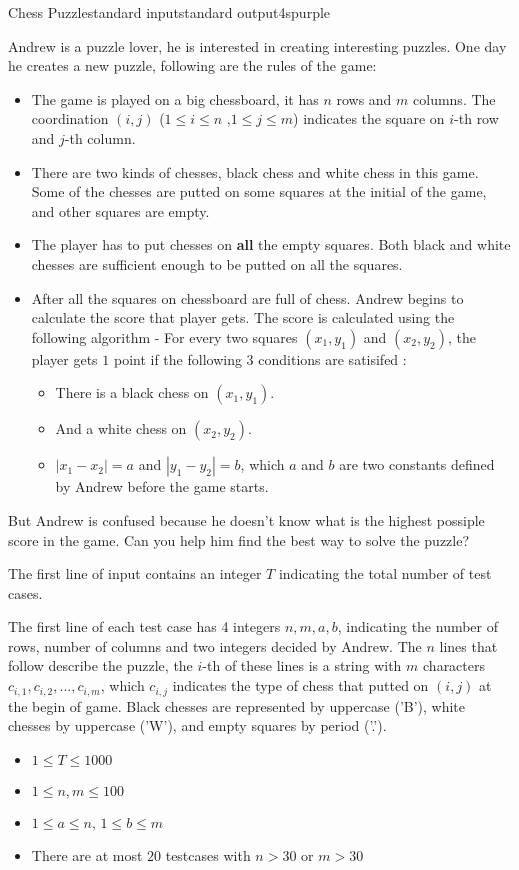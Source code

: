 \begin{problem}{Chess Puzzle}{standard input}{standard output}{4s}{purple}

Andrew is a puzzle lover, he is interested in creating interesting puzzles. One day he creates a new puzzle, following are the rules of the game:
\begin{itemize}
\item The game is played on a big chessboard, it has $n$ rows and $m$ columns. The coordination $(i,j)$ ($1 \le i \le n$ ,$1 \le j \le m$) indicates the square on $i$-th row and $j$-th column.
\item There are two kinds of chesses, black chess and white chess in this game. Some of the chesses are putted on some squares at the initial of the game, and other squares are empty.
\item The player has to put chesses on {\bf all} the empty squares. Both black and white chesses are sufficient enough to be putted on all the squares.
\item After all the squares on chessboard are full of chess. Andrew begins to calculate the score that player gets. The score is calculated using the following algorithm - For every two squares $(x_1, y_1)$ and $(x_2,y_2)$, the player gets $1$ point if the following $3$ conditions are satisifed :
\begin{itemize}
\item There is a black chess on $(x_1, y_1)$.
\item And a white chess on $(x_2, y_2)$.
\item $|x_1 - x_2|=a$ and $|y_1 - y_2| = b$, which $a$ and $b$ are two constants defined by Andrew before the game starts.
\end{itemize}
\end{itemize}
 
But Andrew is confused because he doesn't know what is the highest possiple score in the game. Can you help him find the best way to solve the puzzle?

\InputFile
The first line of input contains an integer $T$ indicating the total number of test cases.

The first line of each test case has 4 integers $n, m, a, b$, indicating the number of rows, number of columns and two integers decided by Andrew.
The $n$ lines that follow describe the puzzle, the $i$-th of these lines is a string with $m$ characters $c_{i,1}, c_{i,2},..., c_{i,m}$, which $c_{i,j}$ indicates the type of chess that putted on $(i,j)$ at the begin of game.
Black chesses are represented by uppercase ('B'), white chesses by uppercase ('W'), and empty squares by period ('.').
\begin{itemize}
\item $1 \le T \le 1000$
\item $1 \le n,m \le 100$
\item $1 \le a \le n$, $1 \le b \le m$
\item There are at most $20$ testcases with $n > 30$ or $m > 30$ 
\end{itemize}


\end{problem}

